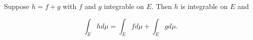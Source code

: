 Suppose $h = f + g$ with $f$ and $g$ integrable on $E$. Then $h$ is integrable on $E$ and

$$\int_E hd\mu = \int_E fd\mu + \int_E gd\mu.$$
